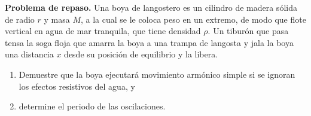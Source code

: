 \item \textbf{Problema de repaso.}
Una boya de langostero es un cilindro de madera sólida de radio $r$ y masa $M$, a la cual se le coloca peso en un extremo, de modo que flote vertical en agua de mar tranquila, que tiene densidad $\rho$. Un tiburón que pasa tensa la soga floja que amarra la boya a una trampa de langosta y jala la boya una distancia $x$ desde su posición de equilibrio y la libera.
\begin{enumerate}
    \item Demuestre que la boya ejecutará movimiento armónico simple si se ignoran los efectos resistivos del agua, y
    \item determine el periodo de las oscilaciones.
\end{enumerate}